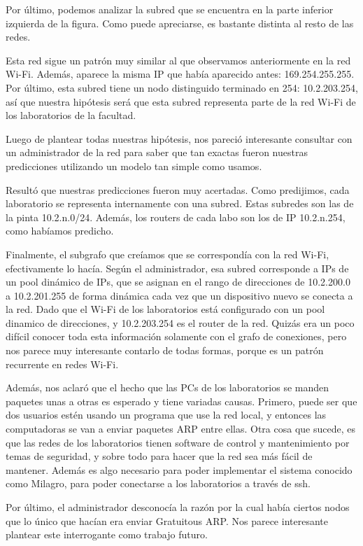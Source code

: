 Por último, podemos analizar la subred que se encuentra en la parte inferior izquierda de la figura. Como puede apreciarse, es bastante distinta al resto de las redes. 

Esta red sigue un patrón muy similar al que observamos anteriormente en la red Wi-Fi. Además, aparece la misma IP que había aparecido antes: 169.254.255.255. Por último, esta subred tiene un nodo distinguido terminado en 254: 10.2.203.254, así que nuestra hipótesis será que esta subred representa parte de la red Wi-Fi de los laboratorios de la facultad.


Luego de plantear todas nuestras hipótesis, nos pareció interesante consultar con un administrador de la red para saber que tan exactas fueron nuestras predicciones utilizando un modelo tan simple como usamos.

Resultó que nuestras predicciones fueron muy acertadas. Como predijimos, cada laboratorio se representa internamente con una subred. Estas subredes son las de la pinta 10.2.n.0/24. Además, los routers de cada labo son los de IP 10.2.n.254, como habíamos predicho.

Finalmente, el subgrafo que creíamos que se correspondía con la red Wi-Fi, efectivamente lo hacía. Según el administrador, esa subred corresponde a IPs de un pool dinámico de IPs, que se asignan en el rango de direcciones de 10.2.200.0 a 10.2.201.255 de forma dinámica cada vez que un dispositivo nuevo se conecta a la red. Dado que el Wi-Fi de los laboratorios está configurado con un pool dinamico de direcciones, y 10.2.203.254 es el router de la red. Quizás era un poco difícil
conocer toda esta información solamente con el grafo de conexiones, pero nos parece muy interesante contarlo de todas formas, porque es un patrón recurrente en redes Wi-Fi.

Además, nos aclaró que el hecho que las PCs de los laboratorios se manden paquetes unas a otras es esperado y tiene variadas causas. Primero, puede ser que dos usuarios est\'en usando un programa que use la red local, y entonces las computadoras se van a enviar paquetes ARP entre ellas. 
Otra cosa que sucede, es que las redes de los laboratorios tienen software de control y mantenimiento por temas de seguridad, y sobre todo para hacer que la red sea más fácil de mantener. Además es algo necesario para poder implementar el sistema conocido como Milagro, para poder conectarse a los laboratorios a trav\'es de ssh.

Por último, el administrador desconocía la razón por la cual había ciertos nodos que lo único que hacían era enviar Gratuitous ARP. Nos parece interesante plantear este interrogante como trabajo futuro.
